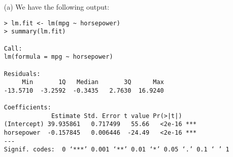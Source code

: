 
\begin{itemize}
    \item[(a)] We have the following output:
        \scriptsize\begin{verbatim}
> lm.fit <- lm(mpg ~ horsepower)
> summary(lm.fit)

Call:
lm(formula = mpg ~ horsepower)

Residuals:
     Min       1Q   Median       3Q      Max 
-13.5710  -3.2592  -0.3435   2.7630  16.9240 

Coefficients:
             Estimate Std. Error t value Pr(>|t|)    
(Intercept) 39.935861   0.717499   55.66   <2e-16 ***
horsepower  -0.157845   0.006446  -24.49   <2e-16 ***
---
Signif. codes:  0 ‘***’ 0.001 ‘**’ 0.01 ‘*’ 0.05 ‘.’ 0.1 ‘ ’ 1


\end{verbatim}
\end{itemize}
